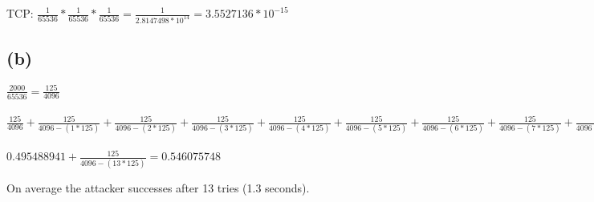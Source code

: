 \documentclass[12pt,pdftex,a4paper]{article}
\begin{document}
TCP: $ \frac{1}{65536} * \frac{1}{65536} * \frac{1}{65536} = \frac{1}{2.8147498*10^{14}} = 3.5527136*10^{-15} $

\subsection*{(b)}
$ \frac{2000}{65536} = \frac{125}{4096} $
\\~\\
$ \frac{125}{4096} + \frac{125}{4096-(1*125)} + \frac{125}{4096-(2*125)} + \frac{125}{4096-(3*125)} + \frac{125}{4096-(4*125)} + \frac{125}{4096-(5*125)} + \frac{125}{4096-(6*125)} + \frac{125}{4096-(7*125)} + \frac{125}{4096-(8*125)} + \frac{125}{4096-(9*125)} + \frac{125}{4096-(10*125)} + \frac{125}{4096-(11*125)} + \frac{125}{4096-(12*125)} = 0.495488941$
\\~\\
$ 0.495488941 + \frac{125}{4096-(13*125)} = 0.546075748 $

On average the attacker successes after 13 tries (1.3 seconds).
\end{document}
